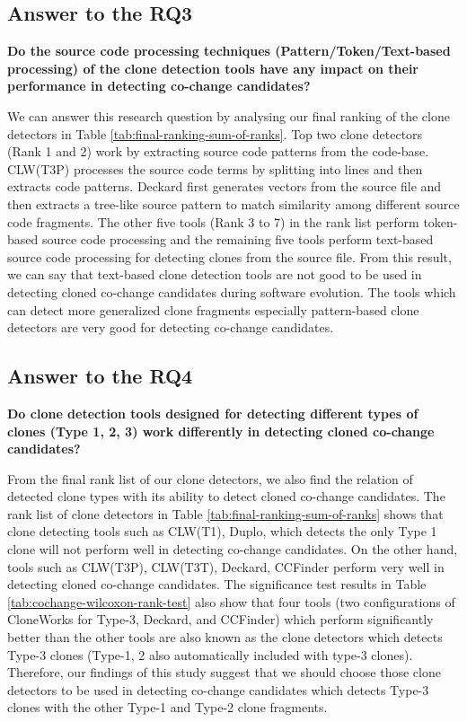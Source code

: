 \documentclass[review]{elsarticle}
\begin{document}
\subsection{Answer to the \textbf{RQ3}}
\textbf{Do the source code processing techniques (Pattern/Token/Text-based processing) of the clone detection tools have any impact on their performance in detecting co-change candidates?}

We can answer this research question by analysing our final ranking of the clone detectors in Table \ref{tab:final-ranking-sum-of-ranks}. Top two clone detectors (Rank 1 and 2) work by extracting source code patterns from the code-base. CLW(T3P) processes the source code terms by splitting into lines and then extracts code patterns. Deckard first generates vectors from the source file and then extracts a tree-like source pattern to match similarity among different source code fragments. The other five tools (Rank 3 to 7) in the rank list perform token-based source code processing and the remaining five tools perform text-based source code processing for detecting clones from the source file. From this result, we can say that text-based clone detection tools are not good to be used in detecting cloned co-change candidates during software evolution. The tools which can detect more generalized clone fragments especially pattern-based clone detectors are very good for detecting co-change candidates. 

\subsection{Answer to the \textbf{RQ4}}
\textbf{Do clone detection tools designed for detecting different types of clones (Type 1, 2, 3) work differently in detecting cloned co-change candidates?}

From the final rank list of our clone detectors, we also find the relation of detected clone types with its ability to detect cloned co-change candidates. The rank list of clone detectors in Table \ref{tab:final-ranking-sum-of-ranks} shows that clone detecting tools such as CLW(T1), Duplo, which detects the only Type 1 clone will not perform well in detecting co-change candidates. On the other hand, tools such as CLW(T3P), CLW(T3T), Deckard, CCFinder perform very well in detecting cloned co-change candidates. The significance test results in Table \ref{tab:cochange-wilcoxon-rank-test} also show that four tools (two configurations of CloneWorks for Type-3, Deckard, and CCFinder) which perform significantly better than the other tools are also known as the clone detectors which detects Type-3 clones (Type-1, 2 also automatically included with type-3 clones). Therefore, our findings of this study suggest that we should choose those clone detectors to be used in detecting co-change candidates which detects Type-3 clones with the other Type-1 and Type-2 clone fragments. 
\end{document}
